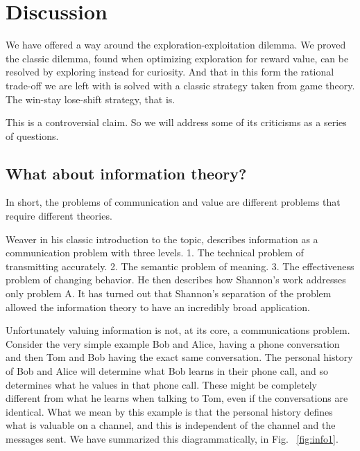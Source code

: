 \section{Discussion}
We have offered a way around the exploration-exploitation dilemma. We proved the classic dilemma, found when optimizing exploration for reward value, can be resolved by exploring instead for curiosity. And that in this form the rational trade-off we are left with is solved with a classic strategy taken from game theory. The win-stay lose-shift strategy, that is.

This is a controversial claim. So we will address some of its criticisms as a series of questions.

\subsection*{What about information theory?}
In short, the problems of communication and value are different problems that require different theories.

Weaver \citep{Shannon1948} in his classic introduction to the topic, describes information as a communication problem with three levels. 1. The technical problem of transmitting accurately. 2. The semantic problem of meaning. 3. The effectiveness problem of changing behavior. He then describes how Shannon's work addresses only problem A. It has turned out that Shannon's separation of the problem allowed the information theory to have an incredibly broad application. 

Unfortunately valuing information is not, at its core, a communications problem. Consider the very simple example Bob and Alice, having a phone conversation and then Tom and Bob having the exact same conversation. The personal history of Bob and Alice will determine what Bob learns in their phone call, and so determines what he values in that phone call. These might be completely different from what he learns when talking to Tom, even if the conversations are identical. What we mean by this example is that the personal history defines what is valuable on a channel, and this is independent of the channel and the messages sent. We have summarized this diagrammatically, in Fig. ~\ref{fig:info1}.

